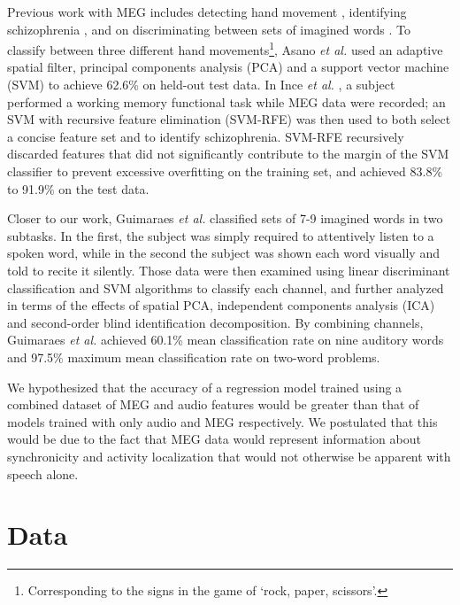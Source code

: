 \documentclass[a4paper]{article}
\begin{document}
Previous work with MEG includes detecting hand movement \cite{Asano2009}, identifying schizophrenia \cite{Ince2008}, and on discriminating between sets of imagined words \cite{Guimaraes2007}. To classify between three different hand movements\footnote{Corresponding to the signs in the game of `rock, paper, scissors'.}, Asano {\em et al.} \cite{Asano2009} used an adaptive spatial filter, principal components analysis (PCA) and a support vector machine (SVM) to achieve 62.6\% on held-out test data. In Ince {\em et al.} \cite{Ince2008}, a subject performed a working memory functional task while MEG data were recorded; an SVM with recursive feature elimination (SVM-RFE) was then used to both select a concise feature set and to identify schizophrenia. SVM-RFE recursively discarded features that did not significantly contribute to the margin of the SVM classifier to prevent excessive overfitting on the training set, and achieved 83.8\% to 91.9\% on the test data.

Closer to our work, Guimaraes {\em et al.} \cite{Guimaraes2007} classified sets of 7-9 imagined words in two subtasks. In the first, the subject was simply required to attentively listen to a spoken word, while in the second the subject was shown each word visually and told to recite it
silently. Those data were then examined using linear discriminant classification and SVM algorithms to classify each
channel, and further analyzed in terms of the effects of spatial PCA, independent components analysis (ICA) and second-order
blind identification decomposition. By combining channels, Guimaraes {\em et al.} achieved 60.1\% mean classification
rate on nine auditory words and 97.5\% maximum mean classification rate on two-word problems.


We hypothesized that the accuracy of a regression model trained using a combined dataset of MEG and audio features would be greater than that of models trained with only audio and MEG respectively. We postulated that this would be due to the fact that MEG data would represent information about synchronicity and activity localization that would not otherwise be apparent with speech alone.

\section{Data}
\end{document}
